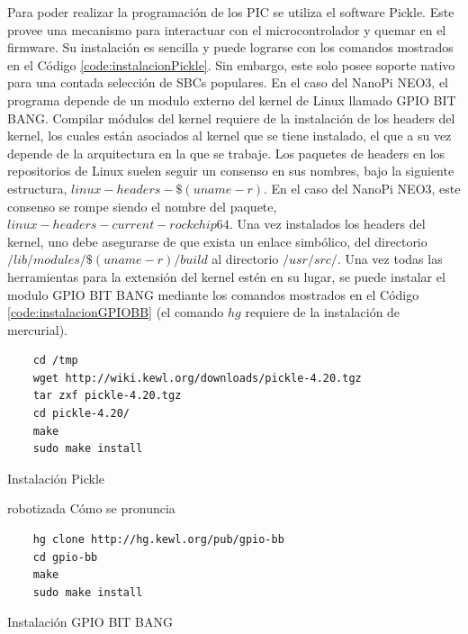 \documentclass[12pt,letterpaper]{article}     %
\begin{document}
Para poder realizar la programación de los PIC se utiliza el software Pickle. 
Este provee una mecanismo para interactuar con el microcontrolador y quemar en el firmware.
Su instalación es sencilla y puede lograrse con los comandos mostrados en el Código \ref{code:instalacionPickle}.
Sin embargo, este solo posee soporte nativo para una contada selección de SBCs populares. En el caso del NanoPi NEO3,
el programa depende de un modulo externo del kernel de Linux llamado GPIO BIT BANG.
Compilar módulos del kernel requiere de la instalación de los headers del kernel, los cuales están asociados al kernel
que se tiene instalado, el que a su vez depende de la arquitectura en la que se trabaje. Los paquetes de headers en los
repositorios de Linux suelen seguir un consenso en sus nombres, bajo la siguiente estructura, 
$linux-headers-\$(uname -r)$. En el caso del NanoPi NEO3, este consenso se rompe siendo el nombre del paquete, 
$linux-headers-current-rockchip64$. Una vez instalados los headers del kernel, uno debe asegurarse de que exista
un enlace simbólico, del directorio $/lib/modules/\$(uname -r)/build$ al directorio $/usr/src/$.
Una vez todas las herramientas para la extensión del kernel estén en su lugar, se puede instalar el modulo 
GPIO BIT BANG mediante los comandos mostrados en el Código \ref{code:instalacionGPIOBB} (el comando $hg$ requiere
de la instalación de mercurial).

\begin{codigo}[]
	\begin{lstlisting}
	cd /tmp
	wget http://wiki.kewl.org/downloads/pickle-4.20.tgz 
	tar zxf pickle-4.20.tgz 
	cd pickle-4.20/
	make
	sudo make install
	\end{lstlisting}
	\caption{Instalación Pickle}robotizada
Cómo se pronuncia
	\label{code:instalacionPickle}
\end{codigo}

\begin{codigo}[!h]
	\begin{lstlisting}
	hg clone http://hg.kewl.org/pub/gpio-bb
	cd gpio-bb
	make
	sudo make install
	\end{lstlisting}
	\caption{Instalación GPIO BIT BANG}
	\label{code:instalacionGPIOBB}
\end{codigo}



\newpage
\end{document}
